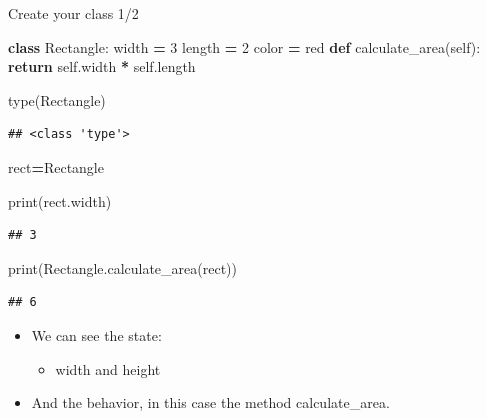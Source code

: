 \documentclass[
  8pt,
  ignorenonframetext,
]{beamer}
\newenvironment{Shaded}{\begin{snugshade}}{\end{snugshade}}
\newcommand{\BuiltInTok}[1]{#1}
\newcommand{\ControlFlowTok}[1]{\textcolor[rgb]{0.13,0.29,0.53}{\textbf{#1}}}
\newcommand{\DecValTok}[1]{\textcolor[rgb]{0.00,0.00,0.81}{#1}}
\newcommand{\KeywordTok}[1]{\textcolor[rgb]{0.13,0.29,0.53}{\textbf{#1}}}
\newcommand{\NormalTok}[1]{#1}
\newcommand{\OperatorTok}[1]{\textcolor[rgb]{0.81,0.36,0.00}{\textbf{#1}}}
\newcommand{\StringTok}[1]{\textcolor[rgb]{0.31,0.60,0.02}{#1}}
\newcommand{\VariableTok}[1]{\textcolor[rgb]{0.00,0.00,0.00}{#1}}
\providecommand{\tightlist}{%
  \setlength{\itemsep}{0pt}\setlength{\parskip}{0pt}}
\begin{document}
\begin{frame}[fragile]{Create your class 1/2}
\protect\hypertarget{create-your-class-12}{}
\begin{Shaded}
\begin{Highlighting}[]
\KeywordTok{class}\NormalTok{ Rectangle:}
\NormalTok{  width }\OperatorTok{=} \DecValTok{3}
\NormalTok{  length }\OperatorTok{=} \DecValTok{2}
\NormalTok{  color }\OperatorTok{=} \StringTok{\textquotesingle{}red\textquotesingle{}}
  \KeywordTok{def}\NormalTok{ calculate\_area(}\VariableTok{self}\NormalTok{):}
      \ControlFlowTok{return} \VariableTok{self}\NormalTok{.width }\OperatorTok{*} \VariableTok{self}\NormalTok{.length}

\BuiltInTok{type}\NormalTok{(Rectangle)    }
\end{Highlighting}
\end{Shaded}

\begin{verbatim}
## <class 'type'>
\end{verbatim}

\begin{Shaded}
\begin{Highlighting}[]
\NormalTok{rect}\OperatorTok{=}\NormalTok{Rectangle}

\BuiltInTok{print}\NormalTok{(rect.width)}
\end{Highlighting}
\end{Shaded}

\begin{verbatim}
## 3
\end{verbatim}

\begin{Shaded}
\begin{Highlighting}[]
\BuiltInTok{print}\NormalTok{(Rectangle.calculate\_area(rect))}
\end{Highlighting}
\end{Shaded}

\begin{verbatim}
## 6
\end{verbatim}

\begin{itemize}
\tightlist
\item
  We can see the state:

  \begin{itemize}
  \tightlist
  \item
    width and height
  \end{itemize}
\item
  And the behavior, in this case the method calculate\_area.
\end{itemize}
\end{frame}
\end{document}
